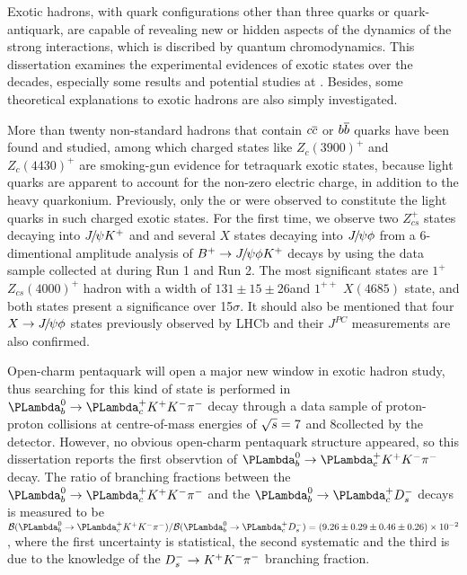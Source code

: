 
\begin{cabstract}


\end{cabstract}

\begin{eabstract}

Exotic hadrons, 
with quark configurations other than three quarks or quark-antiquark,
are capable of revealing new or hidden aspects of the dynamics of the strong interactions,
which is discribed by quantum chromodynamics.
This dissertation examines the experimental evidences of exotic states over the decades,
especially some results and potential studies at \lhcb.
Besides,
some theoretical explanations to exotic hadrons are also simply investigated.


More than twenty non-standard hadrons that contain ${{c}{\overline {{c}}}}$ or ${{b}{\overline {{b}}}}$ quarks have been found and studied,
among which charged states like $Z_c(3900)^+$ and $Z_c(4430)^+$ are smoking-gun evidence for tetraquark exotic states, 
because light quarks are apparent to account for the non-zero electric charge, 
in addition to the heavy quarkonium. 
Previously, only the \uquark or \dquark were observed to constitute the light quarks in such charged exotic states. 
For the first time, 
we observe two $Z_{cs}^+$ states decaying into ${{J\mskip -3mu/\mskip -2mu\psi}} K^+$ and  and several $X$ states decaying into ${{J\mskip -3mu/\mskip -2mu\psi}} \phi$ 
from a 6-dimentional amplitude analysis of ${{{B}^+}}\rightarrow{\ensuremath{{J\mskip -3mu/\mskip -2mu\psi}}} \phi K^+$ decays 
by using the data sample collected at \lhcb during Run 1 and Run 2. 
The most significant states are $1^+$ $Z_{cs}(4000)^+$ hadron with a width of $131\pm15\pm26$\mev and $1^{++}$ $X(4685)$ state,
and both states present a significance over 15$\sigma$. 
It should also be mentioned 
that four $X\rightarrow{\ensuremath{{J\mskip -3mu/\mskip -2mu\psi}}}\phi$ states previously observed by LHCb and their $J^{PC}$ measurements are also confirmed.


Open-charm pentaquark will open a major new window in exotic hadron study,
thus searching for this kind of state is performed in $\Lb\to\Lc\Kp\Km\pim$ decay
through a data sample of proton-proton collisions at centre-of-mass energies of $\protect\sqrt{s}=7$ and 8\tev collected by the \lhcb detector.
However,
no obvious open-charm pentaquark structure appeared,
so this dissertation reports the first observtion of $\Lb\to\Lc\Kp\Km\pim$ decay.
The ratio of branching fractions between the $\Lb\to\Lc\Kp\Km\pim$ and the $\Lb\to\Lc\Dsm$ decays is measured to be 
$\BR( \Lb\to\Lc\Kp\Km\pim )\slash\BR( \Lb\to\Lc\Dsm)=(9.26 \pm 0.29 \pm 0.46 \pm 0.26)\times10^{-2}$,
where the first uncertainty is statistical, 
the second systematic and the third is due to the knowledge of the ${{D}^-_{s}}\rightarrow{\ensuremath{{K}^+}}{\ensuremath{{K}^-}}{\ensuremath{{\pi}^-}}$ branching fraction. 



\end{eabstract}
